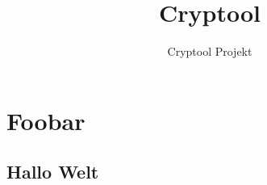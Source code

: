 \documentclass[ngerman]{book}
\title{Cryptool}
\author{Cryptool Projekt}
\begin{document}
\maketitle 
 
\tableofcontents
 
 \chapter{Foobar}
 
 \section{Hallo Welt}
 
 
 \blindtext[3]
 
% 
 
\end{document}

